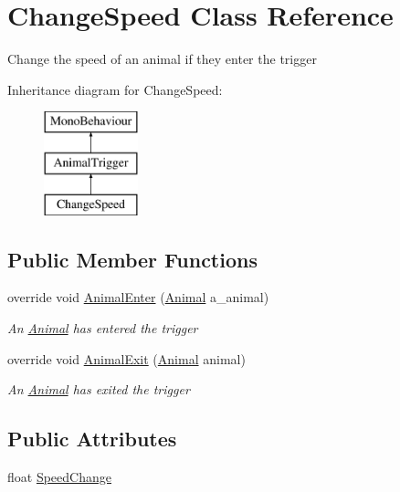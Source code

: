 \hypertarget{class_change_speed}{}\section{Change\+Speed Class Reference}
\label{class_change_speed}


Change the speed of an animal if they enter the trigger  


Inheritance diagram for Change\+Speed\+:\begin{figure}[H]
\begin{center}
\leavevmode
\includegraphics[height=3.000000cm]{class_change_speed}
\end{center}
\end{figure}
\subsection*{Public Member Functions}
\begin{DoxyCompactItemize}
\item 
override void \mbox{\hyperlink{class_change_speed_ae31f3a37d9eca8f2d055867035e02ca4}{Animal\+Enter}} (\mbox{\hyperlink{class_animal}{Animal}} a\+\_\+animal)
\begin{DoxyCompactList}\small\item\em An \mbox{\hyperlink{class_animal}{Animal}} has entered the trigger \end{DoxyCompactList}\item 
override void \mbox{\hyperlink{class_change_speed_ac708140d2ba20cf5bb4307a23f5987dd}{Animal\+Exit}} (\mbox{\hyperlink{class_animal}{Animal}} animal)
\begin{DoxyCompactList}\small\item\em An \mbox{\hyperlink{class_animal}{Animal}} has exited the trigger \end{DoxyCompactList}\end{DoxyCompactItemize}
\subsection*{Public Attributes}
\begin{DoxyCompactItemize}
\item 
float \mbox{\hyperlink{class_change_speed_a8fd2a0a4490f2b9b08d4d8978c60d47b}{Speed\+Change}}
\end{DoxyCompactItemize}
